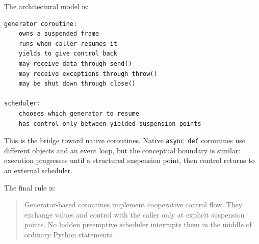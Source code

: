 The architectural model is:

\begin{verbatim}
generator coroutine:
    owns a suspended frame
    runs when caller resumes it
    yields to give control back
    may receive data through send()
    may receive exceptions through throw()
    may be shut down through close()

scheduler:
    chooses which generator to resume
    has control only between yielded suspension points
\end{verbatim}

This is the bridge toward native coroutines. Native \texttt{async def} coroutines use different objects and an event loop, but the conceptual boundary is similar: execution progresses until a structured suspension point, then control returns to an external scheduler.

The final rule is:

\begin{quote}
Generator-based coroutines implement cooperative control flow. They exchange values and control with the caller only at explicit suspension points. No hidden preemptive scheduler interrupts them in the middle of ordinary Python statements.
\end{quote}